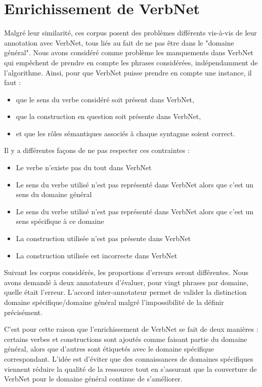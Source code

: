 \section{Enrichissement de VerbNet}
\label{sec:enrichissement_verbnet}

Malgré leur similarité, ces corpus posent des problèmes différents vis-à-vis de
leur annotation avec VerbNet, tous liés au fait de ne pas être dans le "domaine
général". Nous avons considéré comme problème les manquements dans VerbNet qui
empêchent de prendre en compte les phrases considérées, indépendamment de
l'algorithme. Ainsi, pour que VerbNet puisse prendre en compte une instance, il
faut :

\begin{itemize}
    \item que le sens du verbe considéré soit présent dans VerbNet,
    \item que la construction en question soit présente dans VerbNet,
    \item et que les rôles sémantiques associés à chaque syntagme soient correct.
\end{itemize}

Il y a différentes façons de ne pas respecter ces contraintes :

\begin{itemize}
    \item Le verbe n'existe pas du tout dans VerbNet
    \item Le sens du verbe utilisé n'est pas représenté dans VerbNet alors que c'est un sens du domaine général
    \item Le sens du verbe utilisé n'est pas représenté dans VerbNet alors que c'est un sens spécifique à ce domaine
    \item La construction utilisée n'est pas présente dans VerbNet
    \item La construction utilisée est incorrecte dans VerbNet
\end{itemize}

Suivant les corpus considérés, les proportions d'erreurs seront différentes.
Nous avons demandé à deux annotateurs d'évaluer, pour vingt phrases par
domaine, quelle était l'erreur. L'accord inter-annotateur permet de valider la
distinction domaine spécifique/domaine général malgré l'impossibilité de la
définir précisément. %

C'est pour cette raison que l'enrichissement de VerbNet se fait de deux
manières : certains verbes et constructions sont ajoutés comme faisant partie
du domaine général, alors que d'autres sont étiquetés avec le domaine
spécifique correspondant. L'idée est d'éviter que des connaissances de domaines
spécifiques viennent réduire la qualité de la ressource tout en s'assurant que
la couverture de VerbNet pour le domaine général continue de s'améliorer.

